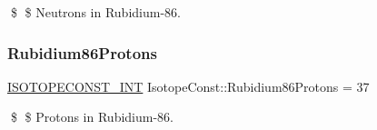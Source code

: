 \$ \$ Neutrons in Rubidium-\/86. \mbox{\label{group___isotope_const-_rubidium-_rb86_ga0212867a0cdf0552328946f05fdd17dd}} 
\subsubsection{\texorpdfstring{Rubidium86\+Protons}{Rubidium86Protons}}
{\footnotesize\ttfamily \mbox{\hyperlink{group___isotope_const-_macros_ga5f18360b3e99483a35c32d789e62621c}{I\+S\+O\+T\+O\+P\+E\+C\+O\+N\+S\+T\+\_\+\+I\+NT}} Isotope\+Const\+::\+Rubidium86\+Protons = 37}

\$ \$ Protons in Rubidium-\/86. 